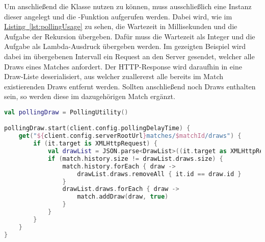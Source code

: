 Um anschließend die Klasse  nutzen zu können, muss ausschließlich eine Instanz dieser angelegt und die -Funktion aufgerufen werden. Dabei wird, wie im \hyperref[lst:pollingUsage]{Listing~\ref{lst:pollingUsage}} zu sehen, die Wartezeit in Millisekunden und die Aufgabe der Rekursion übergeben. Dafür muss die Wartezeit als Integer und die Aufgabe als Lambda-Ausdruck übergeben werden. Im gezeigten Beispiel wird dabei im übergebenen Intervall ein Request an den Server gesendet, welcher alle Draws eines Matches anfordert. Der \gls{HTTP}-Response wird daraufhin in eine Draw-Liste deserialisiert, aus welcher zuallererst alle bereits im Match existierenden Draws entfernt werden. Sollten anschließend noch Draws enthalten sein, so werden diese im dazugehörigen Match ergänzt.\\
\begin{lstlisting}[style=lstStyleFramed, language=Kotlin, caption={Einbindung bzw. Nutzung der \code{PollingUtility} Klasse}, label=lst:pollingUsage, float]
val pollingDraw = PollingUtility()

pollingDraw.start(client.config.pollingDelayTime) {
	get("${client.config.serverRootUrl}matches/$matchId/draws") {
		if (it.target is XMLHttpRequest) {
			val drawList = JSON.parse<DrawList>((it.target as XMLHttpRequest).responseText)
			if (match.history.size != drawList.draws.size) {
				match.history.forEach { draw ->
					drawList.draws.removeAll { it.id == draw.id }
				}
				drawList.draws.forEach { draw ->
					match.addDraw(draw, true)
				}
			}
		}
	}
}
\end{lstlisting}
